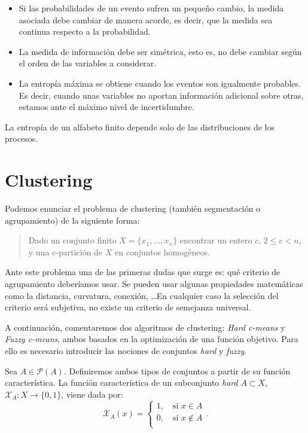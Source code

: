 \documentclass[10pt,a4paper]{article} %
\theoremstyle{definition}
\begin{document}
    \begin{itemize}
    \item Si las probabilidades de un evento sufren un pequeño cambio, la medida asociada debe cambiar de manera acorde, es decir, que la medida sea continua respecto a la probabilidad.
    \item La medida de información debe ser simétrica, esto es, no debe cambiar según el orden de las variables a considerar.
    \item La entropía máxima se obtiene cuando los eventos son igualmente probables. Es decir, cuando unas variables no aportan información adicional sobre otras, estamos ante el máximo nivel de incertidumbre.
    \end{itemize}

    La entropía de un alfabeto finito depende solo de las distribuciones de los procesos.

    
    \section{Clustering}
    Podemos enunciar el problema de clustering (también segmentación o agrupamiento) de la siguiente forma:
    \begin{quote}
      Dado un conjunto finito $X=\{x_1,\dots,x_n\}$ encontrar un entero $c$, $2 \leq c < n$, y una c-partición de $X$ en conjuntos homogéneos.
    \end{quote}
    Ante este problema una de las primeras dudas que surge es: qué criterio de agrupamiento deberíamos usar. Se pueden usar algunas propiedades matemáticas como la distancia, curvatura, conexión, \dots  En cualquier caso la selección del criterio será subjetiva, no existe un criterio de semejanza universal.
    
    A continuación, comentaremos dos algoritmos de clustering: \textit{Hard c-means} y \textit{Fuzzy c-means}, ambos basados en la optimización de una función objetivo. Para ello es necesario introducir las nociones de conjuntos \textit{hard} y \textit{fuzzy}.

    Sea $A \in \mathcal{P}(A)$. Definiremos ambos tipos de conjuntos a partir de su función característica. La función característica de un subconjunto \textit{hard} $A \subset X$, $\mathcal{X}_A:X \to \{0,1\}$, viene dada por:
\[  
\mathcal{X}_A(x) = 
     \begin{cases}
       1, \quad\text{si } x \in A\\
       0, \quad\text{si } x \notin A \\ 
     \end{cases}.
\]
\end{document}
